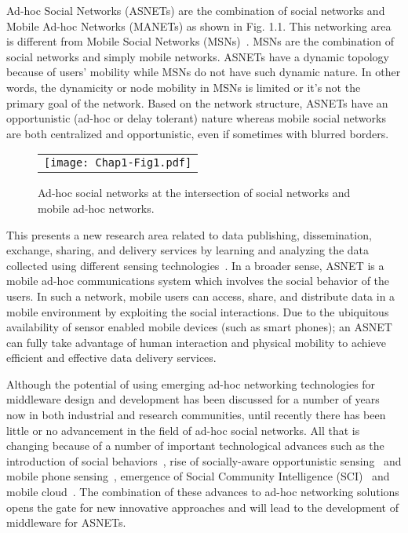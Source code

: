 Ad-hoc Social Networks (ASNETs) are the combination of social networks and Mobile Ad-hoc Networks (MANETs) as shown in Fig. 1.1. This networking area is different from Mobile Social Networks (MSNs)~\cite{NKayastha2012}. MSNs are the combination of social networks and simply mobile networks. ASNETs have a dynamic topology because of users' mobility while MSNs do not have such dynamic nature. In other words, the dynamicity or node mobility in MSNs is limited or it's not the primary goal of the network. Based on the network structure, ASNETs have an opportunistic (ad-hoc or delay tolerant) nature whereas mobile social networks are both centralized and opportunistic, even if sometimes with blurred borders.
\begin{figure}[b]
\begin{center}
  \begin{tabular}{c}
  \texttt{[image: Chap1-Fig1.pdf]}
  \end{tabular}
  \caption{Ad-hoc social networks at the intersection of social networks and mobile ad-hoc networks.}
\end{center}
\end{figure}

This presents a new research area related to data publishing, dissemination, exchange, sharing, and delivery services by learning and analyzing the data collected using different sensing technologies~\cite{RKGanti2011}. In a broader sense, ASNET is a mobile ad-hoc communications system which involves the social behavior of the users. In such a network, mobile users can access, share, and distribute data in a mobile environment by exploiting the social interactions. Due to the ubiquitous availability of sensor enabled mobile devices (such as smart phones); an ASNET can fully take advantage of human interaction and physical mobility to achieve efficient and effective data delivery services.

Although the potential of using emerging ad-hoc networking technologies for middleware design and development has been discussed for a number of years now in both industrial and research communities, until recently there has been little or no advancement in the field of ad-hoc social networks. All that is changing because of a number of important technological advances such as the introduction of social behaviors~\cite{FXia2013}, rise of socially-aware opportunistic sensing~\cite{HJohnson2011} and mobile phone sensing~\cite{NDLane2010}, emergence of Social Community Intelligence (SCI)~\cite{DZhang2012} and mobile cloud~\cite{NFernando2013}. The combination of these advances to ad-hoc networking solutions opens the gate for new innovative approaches and will lead to the development of middleware for ASNETs.

